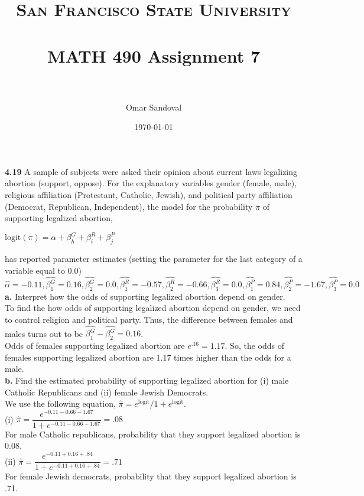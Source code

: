 \documentclass[paper=letter, fontsize=11pt]{scrartcl} %
\title{	
\normalfont \normalsize 
\textsc{San Francisco State University} \\ [25pt]
\horrule{0.5pt} \\[0.4cm] %
\huge MATH 490 Assignment 7  \\ %
\horrule{2pt} \\[0.5cm] %
}
\author{Omar Sandoval}
\date{\normalsize\today}
\begin{document}
\maketitle

\textbf{4.19} A sample of subjects were asked their opinion about current laws 
legalizing abortion (support, oppose). For the explanatory variables gender (female,
male), religious affiliation (Protestant, Catholic, Jewish), and political party
affiliation (Democrat, Republican, Independent), the model for the probability
$\pi$ of supporting legalized abortion, \\

\begin{center}
    $\text{logit} (\pi) = \alpha + \beta_h^G + \beta_i^R + \beta_j^P$
\end{center}

has reported parameter estimates (setting the parameter for the last category
of a variable equal to 0.0) $\hat{\alpha} = -0.11, \hat{\beta_1^G} = 0.16, 
\hat{\beta_2^G} = 0.0, \hat{\beta_1^R} = -0.57, \hat{\beta_2^R} = -0.66, 
\hat{\beta_3^R} = 0.0, \hat{\beta_1^P} = 0.84, \hat{\beta_2^P} = -1.67, 
\hat{\beta_3^P} = 0.0$ \\

\textbf{a.} Interpret how the odds of supporting legalized abortion depend on gender. \\
To find the how odds of supporting legalized abortion depend on gender, we need to 
control religion and political party. Thus, the difference between females and males
turns out to be $\hat{\beta_1^G} - \hat{\beta_2^G} = 0.16$. \\
Odds of females supporting legalized abortion are $e^{.16} = 1.17$. So, the odds of 
females supporting legalized abortion are 1.17 times higher than the odds for a male.
\\

\textbf{b.} Find the estimated probability of supporting legalized abortion for (i) male
Catholic Republicans and (ii) female Jewish Democrats. \\
We use the following equation, $\hat{\pi} = e^{\text{logit}}/1+e^{\text{logit}}$. \\
(i) $\hat{\pi} = \dfrac{e^{-0.11-0.66-1.67}}{1+e^{-0.11-0.66-1.67}} = .08$ \\
For male Catholic republicans, probability that they support legalized abortion is 0.08. \\
(ii) $\hat{\pi} = \dfrac{e^{-0.11+0.16+.84}}{1+e^{-0.11+0.16+.84}} = .71$ \\
For female Jewish democrats, probability that they support legalized abortion is .71. \\
\\
\end{document}
